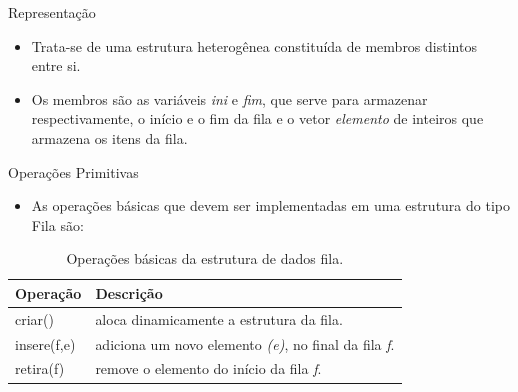 \begin{frame}[fragile]{Representação}

\begin{itemize}
	\item Trata-se de uma estrutura heterogênea constituída de 
	membros distintos entre si.
	 
	 \item Os membros são as variáveis \alert{\textit{ini}} e \alert{\textit{fim}},
	  que serve para armazenar respectivamente, o início e o fim da fila e o
	   vetor \alert{\textit{elemento}} 
	 de inteiros que armazena os itens da fila.
\end{itemize}
\end{frame}


\begin{frame}{Operações Primitivas}
  \begin{itemize}
	  \item As operações básicas que devem ser implementadas em uma estrutura do tipo Fila são:		
  \end{itemize}
  \begin{table}[ht]
			  \centering
						\begin{tabular}{l||l}
						    \hline \hline 
						    \textbf{Operação} & \textbf{Descrição} \\
						    \hline \hline 
						    criar() & aloca dinamicamente a estrutura da fila.\\
						    \hline 
						    insere(f,e) & adiciona um novo elemento \textit{(e)}, no final da fila \textit{f}.\\
						    \hline 
						    retira(f) & remove o elemento do início da fila \textit{f}.\\						   
						    \hline \hline 
						\end{tabular}
						\caption{Operações básicas da estrutura de dados fila.}
				\end{table}
\end{frame}
 
